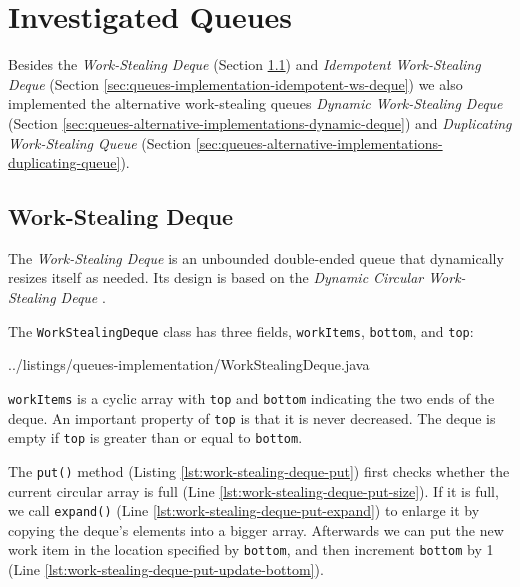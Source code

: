 
\chapter{Investigated Queues}
\label{chap:queues-implementation}

Besides the \emph{Work-Stealing Deque} (Section
\ref{sec:queues-implementation-ws-deque}) and \emph{Idempotent
  Work-Stealing Deque} (Section
\ref{sec:queues-implementation-idempotent-ws-deque}) we also
implemented the alternative work-stealing queues \emph{Dynamic
  Work-Stealing Deque} (Section
\ref{sec:queues-alternative-implementations-dynamic-deque}) and
\emph{Duplicating Work-Stealing Queue} (Section
\ref{sec:queues-alternative-implementations-duplicating-queue}).

\section{Work-Stealing Deque}
\label{sec:queues-implementation-ws-deque}

The \emph{Work-Stealing Deque} is an unbounded double-ended queue that
dynamically resizes itself as needed. Its design is based on the
\emph{Dynamic Circular Work-Stealing Deque} \cite{Chase2005, Lev2005}.

The \lstinline!WorkStealingDeque! class has three fields,
\lstinline!workItems!, \lstinline!bottom!, and \lstinline!top!:


{
    ../listings/queues-implementation/WorkStealingDeque.java
}

\lstinline!workItems! is a cyclic array with \lstinline!top! and
\lstinline!bottom! indicating the two ends of the deque. An important
property of \lstinline!top! is that it is never decreased. The deque
is empty if \lstinline!top! is greater than or equal to
\lstinline!bottom!.

The \lstinline!put()! method (Listing
\ref{lst:work-stealing-deque-put}) first checks whether the current
circular array is full (Line
\ref{lst:work-stealing-deque-put-size}). If it is full, we call
\lstinline!expand()! (Line \ref{lst:work-stealing-deque-put-expand})
to enlarge it by copying the deque's elements into a bigger
array. Afterwards we can put the new work item in the location
specified by \lstinline!bottom!, and then increment \lstinline!bottom!
by 1 (Line \ref{lst:work-stealing-deque-put-update-bottom}).

